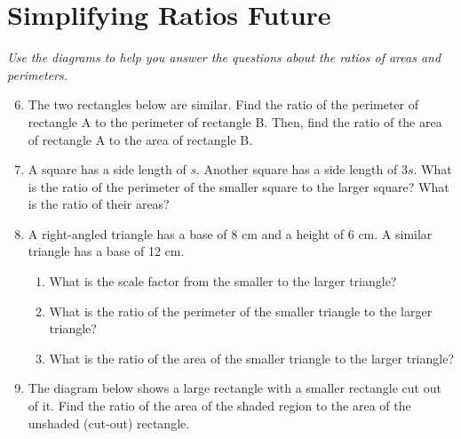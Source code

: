 \documentclass[12pt,a4paper]{article}
\begin{document}
\newpage{}

\section*{Simplifying Ratios Future}
\emph{Use the diagrams to help you answer the questions about the ratios of areas and perimeters.}

\begin{enumerate}
\setcounter{enumi}{5}
\item The two rectangles below are similar. Find the ratio of the perimeter of rectangle A to the perimeter of rectangle B. Then, find the ratio of the area of rectangle A to the area of rectangle B.

\vspace{0.5cm}
\begin{center}
\end{center}

\vspace{1.2cm}

\item A square has a side length of \( s \). Another square has a side length of \( 3s \). What is the ratio of the perimeter of the smaller square to the larger square? What is the ratio of their areas?

\vspace{1.2cm}

\item A right-angled triangle has a base of 8 cm and a height of 6 cm. A similar triangle has a base of 12 cm.
    \begin{enumerate}
    \item What is the scale factor from the smaller to the larger triangle?
    \item What is the ratio of the perimeter of the smaller triangle to the larger triangle?
    \item What is the ratio of the area of the smaller triangle to the larger triangle?
    \end{enumerate}

\vspace{1.2cm}

\newpage{}

\item The diagram below shows a large rectangle with a smaller rectangle cut out of it. Find the ratio of the area of the shaded region to the area of the unshaded (cut-out) rectangle.


\end{enumerate}
\end{document}
